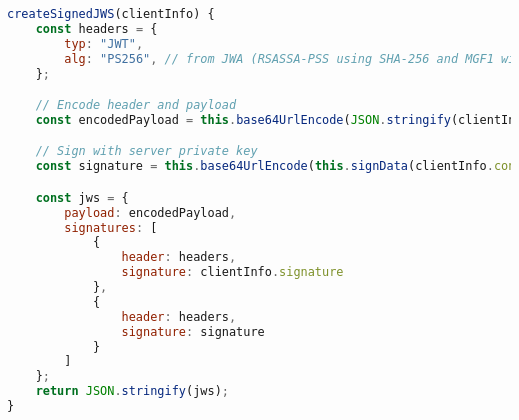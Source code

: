 \begin{lstlisting}[language=Javascript]
createSignedJWS(clientInfo) {
	const headers = {
		typ: "JWT",
		alg: "PS256", // from JWA (RSASSA-PSS using SHA-256 and MGF1 with SHA-256)
	};

	// Encode header and payload
	const encodedPayload = this.base64UrlEncode(JSON.stringify(clientInfo.consent));

	// Sign with server private key
	const signature = this.base64UrlEncode(this.signData(clientInfo.consent));

	const jws = {
		payload: encodedPayload,
		signatures: [
			{
				header: headers,
				signature: clientInfo.signature
			},
			{
				header: headers,
				signature: signature
			}
		]
	};
	return JSON.stringify(jws);
}
\end{lstlisting}
